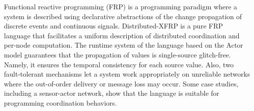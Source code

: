 Functional reactive programming (FRP) is a programming paradigm where a system is described using declarative abstractions of the change propagation of discrete events and continuous signals. Distributed-XFRP is a pure FRP language that facilitates a uniform description of distributed coordination and per-node computation. The runtime system of the language based on the Actor model guarantees that the propagation of values is single-source glitch-free. Namely, it ensures the temporal consistency for each source value. Also, two fault-tolerant mechanisms let a system work appropriately on unreliable networks where the out-of-order delivery or message loss may occur. Some case studies, including a sensor-actor network, show that the language is suitable for programming coordination behaviors.